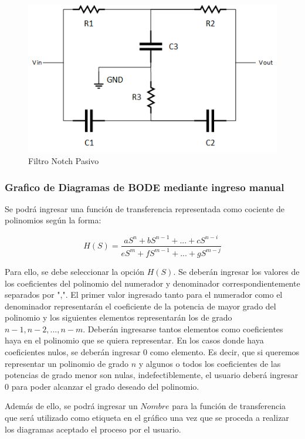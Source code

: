 \begin{figure}[h]
	\centering
	\includegraphics[scale=1]{../EJ1/circuito.png}
	\caption{Filtro Notch Pasivo}
	\label{ej1cir}
\end{figure}

\subsubsection{Grafico de Diagramas de BODE mediante ingreso manual}


Se podrá ingresar una función de transferencia representada como cociente de polinomios según la forma:

$$H(S) = \frac{aS^n + bS^{n-1}+ ... +cS^{n-i}}{eS^m + fS^{m-1}+ ... +gS^{m-j}} $$

Para ello, se debe seleccionar la opción $H(S)$. Se deberán ingresar los valores de los coeficientes del polinomio del numerador y denominador correspondientemente separados por ",". El primer valor ingresado tanto para el numerador como el denominador representarán el coeficiente de la potencia de mayor grado del polinomio y los siguientes elementos representarán los de grado $n-1, n -2 , ... , n-m$. Deberán ingresarse tantos elementos como coeficientes haya en el polinomio que se quiera representar. En los casos donde haya coeficientes nulos, se deberán ingresar $0$ como elemento.
Es decir, que si queremos representar un polinomio de grado $n$ y algunos o todos los coeficientes de las potencias de grado menor son nulas, indefectiblemente, el usuario deberá ingresar $0$ para poder alcanzar el grado deseado del polinomio.

Además de ello, se podrá ingresar un $Nombre$ para la función de transferencia que será utilizado como etiqueta en el gráfico una vez que se proceda a realizar los diagramas aceptado el proceso por el usuario.

